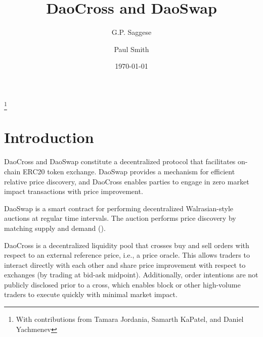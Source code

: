 \documentclass[11pt, reqno]{amsart}
\begin{document}
\title{DaoCross and DaoSwap}

\author{G.P. Saggese}
\author{Paul Smith}

\thanks{With contributions from Tamara Jordania, Samarth KaPatel, and Daniel Yachmenev}

\date{\today}

\maketitle

\tableofcontents



\section{Introduction}
DaoCross and DaoSwap constitute a decentralized protocol that facilitates
on-chain ERC20 token exchange. DaoSwap provides a mechanism for efficient
relative price discovery, and DaoCross enables parties to engage in
zero market impact transactions with price improvement.

DaoSwap is a smart contract for performing decentralized Walrasian-style
auctions at regular time intervals. The auction performs price discovery by
matching supply and demand (\cite{Wa}).

DaoCross is a decentralized liquidity pool that crosses buy and sell orders
with respect to an external reference price, i.e., a price oracle. This allows
traders to interact directly with each other and share price improvement with
respect to exchanges (by trading at bid-ask midpoint). Additionally, order
intentions are not publicly disclosed prior to a cross, which enables block or
other high-volume traders to execute quickly with minimal market impact.
\end{document}
